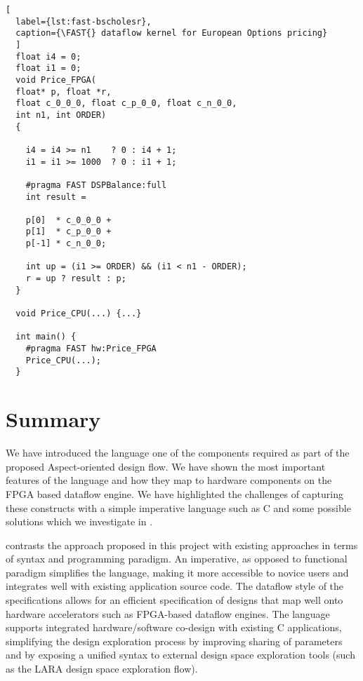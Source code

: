 \lstset{style=MaxC}

\begin{lstlisting}[
  label={lst:fast-bscholesr},
  caption={\FAST{} dataflow kernel for European Options pricing}
  ]
  float i4 = 0;
  float i1 = 0;
  void Price_FPGA(
  float* p, float *r,
  float c_0_0_0, float c_p_0_0, float c_n_0_0,
  int n1, int ORDER)
  {

    i4 = i4 >= n1    ? 0 : i4 + 1;
    i1 = i1 >= 1000  ? 0 : i1 + 1;

    #pragma FAST DSPBalance:full
    int result =

    p[0]  * c_0_0_0 +
    p[1]  * c_p_0_0 +
    p[-1] * c_n_0_0;

    int up = (i1 >= ORDER) && (i1 < n1 - ORDER);
    r = up ? result : p;
  }

  void Price_CPU(...) {...}

  int main() {
    #pragma FAST hw:Price_FPGA
    Price_CPU(...);
  }
\end{lstlisting}


\section{Summary}

We have introduced the \FAST{} language one of the components required
as part of the proposed Aspect-oriented design flow. We have shown the
most important features of the \FAST{} language and how they map to
hardware components on the FPGA based dataflow engine. We have
highlighted the challenges of capturing these constructs with a simple
imperative language such as C and some possible solutions which we
investigate in  .

 contrasts the \FAST{} approach
proposed in this project with existing approaches in terms of syntax
and programming paradigm. An imperative, as opposed to functional
paradigm simplifies the language, making it more accessible to novice
users and integrates well with existing application source code. The
dataflow style of the \FAST{} specifications allows for an efficient
specification of designs that map well onto hardware accelerators such
as FPGA-based dataflow engines. The language supports integrated
hardware/software co-design with existing C applications, simplifying
the design exploration process by improving sharing of parameters and
by exposing a unified syntax to external design space exploration
tools (such as the LARA design space exploration flow).

